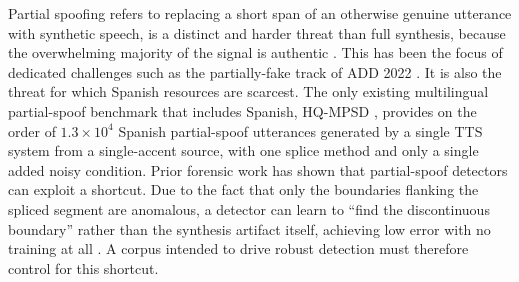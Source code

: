 \documentclass[11pt]{article}
\begin{document}
Partial spoofing refers to replacing a short span of an otherwise genuine utterance with synthetic speech, is a distinct and harder threat than full synthesis, because the overwhelming majority of the signal is authentic \citep{zhang2023partialspoof}. This has been the focus of dedicated challenges such as the partially-fake track of ADD 2022 \citep{add2022}. It is also the threat for which Spanish resources are scarcest. The only existing multilingual partial-spoof benchmark that includes Spanish, HQ-MPSD \citep{li2025hqmpsd}, provides on the order of $1.3\times10^{4}$ Spanish partial-spoof utterances generated by a single TTS system from a single-accent source, with one splice method and only a single added noisy condition. Prior forensic work has shown that partial-spoof detectors can exploit a shortcut. Due to the fact that only the boundaries flanking the spliced segment are anomalous, a detector can learn to ``find the discontinuous boundary'' rather than the synthesis artifact itself, achieving low error with no training at all \citep{negroni2024splicing,huang2024detectable}. A corpus intended to drive robust detection must therefore control for this shortcut.
\end{document}
